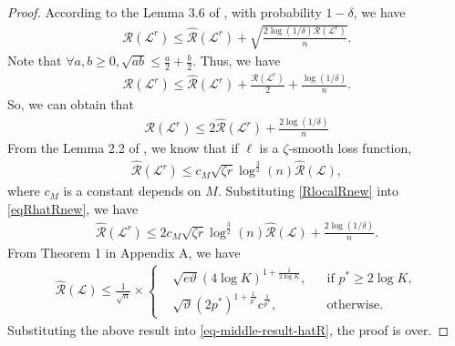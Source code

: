 \documentclass{article}
\begin{document}
\begin{proof}
  According to the Lemma 3.6 of \cite{oneto2013improved},
  with probability $1-\delta$, we have
  \begin{align*}
    \mathcal{R}(\mathcal{L}^r)\leq \hat{\mathcal{R}}(\mathcal{L}^r)+\sqrt{\frac{2\log(1/\delta)\mathcal{R}(\mathcal{L}^r)}{n}}.
  \end{align*}
  Note that $\forall a,b\geq 0, \sqrt{ab}\leq \frac{a}{2}+\frac{b}{2}$.
  Thus, we have
  \begin{align*}
    \mathcal{R}(\mathcal{L}^r)\leq \hat{\mathcal{R}}(\mathcal{L}^r)+\frac{\mathcal{R}(\mathcal{L}^r)}{2}+\frac{\log(1/\delta)}{n}.
  \end{align*}
  So, we can obtain that
  \begin{align}
  \label{eqRhatRnew}
    \mathcal{R}(\mathcal{L}^r)\leq 2\hat{\mathcal{R}}(\mathcal{L}^r)+\frac{2\log(1/\delta)}{n}
  \end{align}
  From the Lemma 2.2 of \cite{Srebro2010lrc},
  we know that if $\ell$ is a $\zeta$-smooth loss function,
  \begin{align}
   \label{RlocalRnew}
    \hat{\mathcal{R}}(\mathcal{L}^r)\leq c_M\sqrt{\zeta r}\log^{\frac{3}{2}}(n)\hat{\mathcal{R}}(\mathcal{L}),
  \end{align}
  where $c_M$ is a constant depends on $M$.
  Substituting  \eqref{RlocalRnew} into \eqref{eqRhatRnew},
  we have
  \begin{align}
  \label{eq-middle-result-hatR}
    \hat{\mathcal{R}}(\mathcal{L}^r)\leq 2c_M\sqrt{\zeta r}\log^{\frac{3}{2}}(n)\hat{\mathcal{R}}(\mathcal{L})
    +\frac{2\log(1/\delta)}{n}.
  \end{align}
  From Theorem 1 in Appendix A,
  we have
  \begin{align*}
    \hat{\mathcal{R}}(\mathcal{L})\leq \frac{1}{\sqrt{n}}\times
      \left\{
      \begin{aligned}
      &\sqrt{e\vartheta}(4\log K)^{1+\frac{1}{2\log K}}, &&\text{if } p^\ast\geq 2\log K,\\
      &\sqrt{\vartheta}(2p^\ast)^{1+\frac{1}{p^\ast}}c^{\frac{1}{p^\ast}}, &&\text{otherwise.}
      \end{aligned}
      \right.
  \end{align*}
  Substituting the above result into \eqref{eq-middle-result-hatR},
  the proof is over.
\end{proof}
\end{document}
